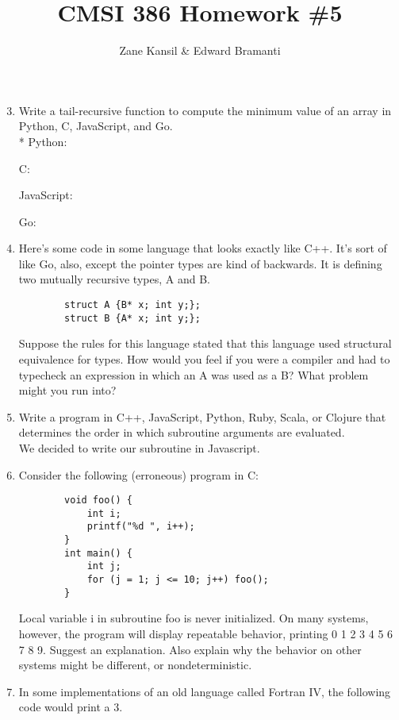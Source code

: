 \documentclass{article}
\title{CMSI 386 Homework \#5}
\author{Zane Kansil \& Edward Bramanti}
\begin{document}
\maketitle
\begin{enumerate}
	\setcounter{enumi}{2}
	\item Write a tail-recursive function to compute the minimum value of an array in Python, C, JavaScript, and Go. \\*
	\linebreak
	Python:
	
	\pagebreak
	C:
	
	\pagebreak
	JavaScript:
	
	\pagebreak
	Go:
	
	\pagebreak
	\item Here's some code in some language that looks exactly like C++. It's sort of like Go, also, except the pointer types are kind of backwards. It is defining two mutually recursive types, A and B.
	\begin{verbatim}
    	struct A {B* x; int y;};
    	struct B {A* x; int y;};
    \end{verbatim}
	Suppose the rules for this language stated that this language used structural equivalence for types. How would you feel if you were a compiler and had to typecheck an expression in which an A was used as a B? What problem might you run into?
	\pagebreak
	\item Write a program in C++, JavaScript, Python, Ruby, Scala, or Clojure that determines the order in which subroutine arguments are evaluated. \\
	\linebreak
	We decided to write our subroutine in Javascript.
	
	\pagebreak
	\item Consider the following (erroneous) program in C:
	\begin{verbatim}
		void foo() {
		    int i;
		    printf("%d ", i++);
		}
		int main() {
		    int j;
		    for (j = 1; j <= 10; j++) foo();
		}
	\end{verbatim}
	Local variable i in subroutine foo is never initialized. On many systems, however, the program will display repeatable behavior, printing 0 1 2 3 4 5 6 7 8 9. Suggest an explanation. Also explain why the behavior on other systems might be different, or nondeterministic.
	\setcounter{enumi}{7}
	\pagebreak
	\item In some implementations of an old language called Fortran IV, the following code would print a 3. 
	\begin{verbatim} 

\end{verbatim}
\end{enumerate}
\end{document}
